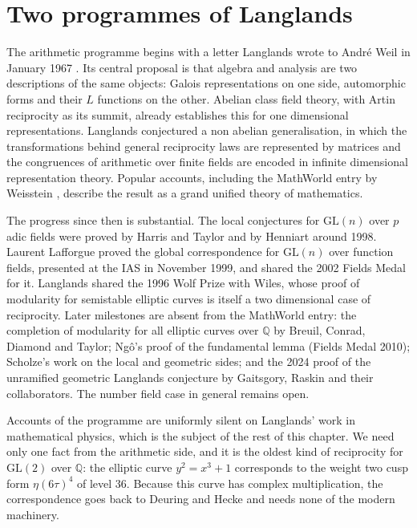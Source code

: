 \section{Two programmes of Langlands}\label{perc:sec:two}

The arithmetic programme begins with a letter Langlands wrote to André Weil in January 1967 \cite{langlands1967}. Its central proposal is that algebra and analysis are two descriptions of the same objects: Galois representations on one side, automorphic forms and their $L$ functions on the other. Abelian class field theory, with Artin reciprocity as its summit, already establishes this for one dimensional representations. Langlands conjectured a non abelian generalisation, in which the transformations behind general reciprocity laws are represented by matrices and the congruences of arithmetic over finite fields are encoded in infinite dimensional representation theory. Popular accounts, including the MathWorld entry by Weisstein \cite{weisstein}, describe the result as a grand unified theory of mathematics.

The progress since then is substantial. The local conjectures for $\mathrm{GL}(n)$ over $p$ adic fields were proved by Harris and Taylor and by Henniart around 1998. Laurent Lafforgue proved the global correspondence for $\mathrm{GL}(n)$ over function fields, presented at the IAS in November 1999, and shared the 2002 Fields Medal for it. Langlands shared the 1996 Wolf Prize with Wiles, whose proof of modularity for semistable elliptic curves is itself a two dimensional case of reciprocity. Later milestones are absent from the MathWorld entry: the completion of modularity for all elliptic curves over $\mathbb{Q}$ by Breuil, Conrad, Diamond and Taylor; Ngô's proof of the fundamental lemma (Fields Medal 2010); Scholze's work on the local and geometric sides; and the 2024 proof of the unramified geometric Langlands conjecture by Gaitsgory, Raskin and their collaborators. The number field case in general remains open.

Accounts of the programme are uniformly silent on Langlands' work in mathematical physics, which is the subject of the rest of this chapter. We need only one fact from the arithmetic side, and it is the oldest kind of reciprocity for $\mathrm{GL}(2)$ over $\mathbb{Q}$: the elliptic curve $y^2 = x^3+1$ corresponds to the weight two cusp form $\eta(6\tau)^4$ of level 36. Because this curve has complex multiplication, the correspondence goes back to Deuring and Hecke and needs none of the modern machinery.

